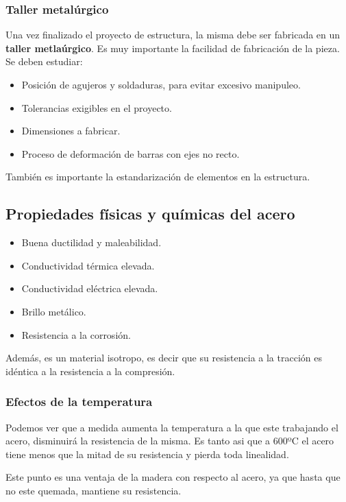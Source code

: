 \subsubsection{Taller metalúrgico}

Una vez finalizado el proyecto de estructura, la misma debe ser fabricada en un
\textbf{taller metlaúrgico}. Es muy importante la facilidad de fabricación de 
la pieza. Se deben estudiar:
\begin{itemize}
  \item Posición de agujeros y soldaduras, para evitar excesivo manipuleo.
  \item Tolerancias exigibles en el proyecto.
  \item Dimensiones a fabricar.
  \item Proceso de deformación de barras con ejes no recto.
\end{itemize}

También es importante la estandarización de elementos en la estructura.

\subsection{Propiedades físicas y químicas del acero}

\begin{itemize}
  \item Buena ductilidad y maleabilidad.
  \item Conductividad térmica elevada.
  \item Conductividad eléctrica elevada.
  \item Brillo metálico.
  \item Resistencia a la corrosión.
\end{itemize}

Además, es un material isotropo, es decir que su resistencia a la tracción es 
idéntica a la resistencia a la compresión.

\subsubsection{Efectos de la temperatura}

Podemos ver que a medida aumenta la temperatura a la que este trabajando el acero,
disminuirá la resistencia de la misma. Es tanto asi que a 600ºC el acero tiene
menos que la mitad de su resistencia y pierda toda linealidad.

Este punto es una ventaja de la madera con respecto al acero, ya que hasta que no
este quemada, mantiene su resistencia.


